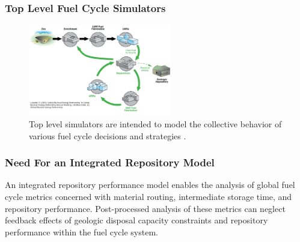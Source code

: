 

\begin{frame}[ctb!]
  \frametitle{Top Level Fuel Cycle Simulators}
  \begin{figure}[htbp!]
    \begin{center}
      \includegraphics[height=4cm]{./images/simulations.eps}
    \end{center}
    \caption{Top level simulators are intended to model the collective 
    behavior of various fuel cycle decisions and 
    strategies \cite{lisowski_global_2007}.}
    \label{fig:simulation}
  \end{figure}
\end{frame}

\begin{frame}[ctb!]
  \frametitle{Need For an Integrated Repository Model}

  
An integrated repository performance model enables the analysis of global fuel 
cycle metrics concerned with material routing, intermediate storage time, and 
repository performance. Post-processed analysis of these metrics can neglect 
feedback effects of geologic disposal capacity constraints and repository 
performance within the fuel cycle system.

\end{frame}

